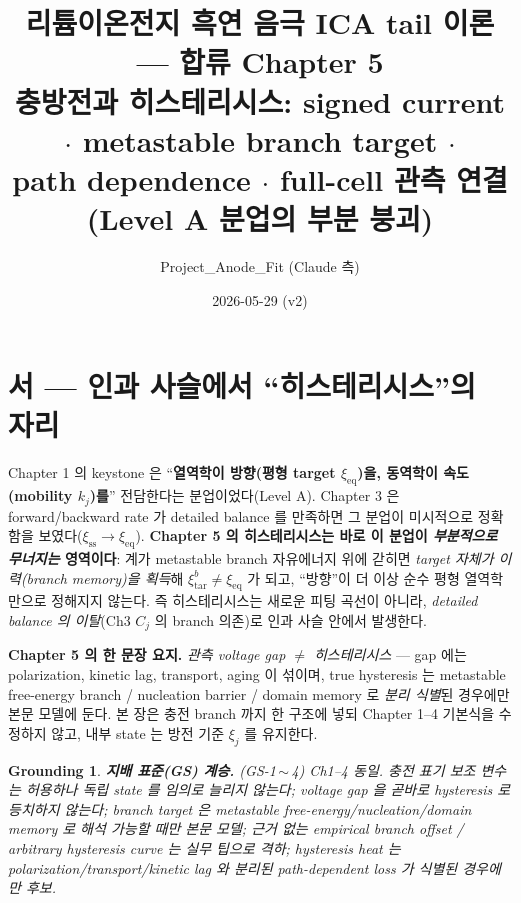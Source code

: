 \documentclass[11pt,a4paper]{article}
\title{\textbf{리튬이온전지 흑연 음극 ICA tail 이론 — 합류 Chapter 5}\\[0.4em]
\large 충방전과 히스테리시스: signed current $\cdot$ metastable branch target $\cdot$\\
path dependence $\cdot$ full-cell 관측 연결 (Level A 분업의 부분 붕괴)}
\author{Project\_Anode\_Fit (Claude 측)}
\date{2026-05-29 (v2)}
\newtheorem*{groundingbox}{Grounding}
\newcommand{\eq}{\mathrm{eq}}
\newcommand{\tar}{\mathrm{tar}}
\newcommand{\sstat}{\mathrm{ss}}
\begin{document}
\maketitle

\section*{서 — 인과 사슬에서 ``히스테리시스''의 자리}
Chapter 1 의 keystone 은 ``\textbf{열역학이 방향(평형 target $\xi_{\eq}$)을, 동역학이 속도(mobility $k_j$)를}''
전담한다는 분업이었다(Level A). Chapter 3 은 forward/backward rate 가 detailed balance 를 만족하면 그 분업이
미시적으로 정확함을 보였다($\xi_{\sstat}\to\xi_{\eq}$). \textbf{Chapter 5 의 히스테리시스는 바로 이 분업이
\emph{부분적으로 무너지는} 영역이다}: 계가 metastable branch 자유에너지 위에 갇히면 \emph{target 자체가
이력(branch memory)을 획득}해 $\xi_{\tar}^b\ne\xi_{\eq}$ 가 되고, ``방향''이 더 이상 순수 평형 열역학만으로
정해지지 않는다. 즉 히스테리시스는 새로운 피팅 곡선이 아니라, \emph{detailed balance 의 이탈}(Ch3 $C_j$ 의
branch 의존)로 인과 사슬 안에서 발생한다.

\textbf{Chapter 5 의 한 문장 요지.} \emph{관측 voltage gap $\ne$ 히스테리시스} — gap 에는 polarization,
kinetic lag, transport, aging 이 섞이며, true hysteresis 는 metastable free-energy branch / nucleation
barrier / domain memory 로 \emph{분리 식별}된 경우에만 본문 모델에 둔다. 본 장은 충전 branch 까지 한 구조에
넣되 Chapter 1--4 기본식을 수정하지 않고, 내부 state 는 방전 기준 $\xi_j$ 를 유지한다.

\begin{groundingbox}
\textbf{지배 표준(GS) 계승.} (GS-1\,$\sim$\,4) Ch1--4 동일. 충전 표기 보조 변수는 허용하나 독립 state 를
임의로 늘리지 않는다; voltage gap 을 곧바로 hysteresis 로 등치하지 않는다; branch target 은 metastable
free-energy/nucleation/domain memory 로 해석 가능할 때만 본문 모델; 근거 없는 empirical branch offset /
arbitrary hysteresis curve 는 실무 팁으로 격하; hysteresis heat 는 polarization/transport/kinetic lag 와
분리된 path-dependent loss 가 식별된 경우에만 후보.
\end{groundingbox}

\tableofcontents
\newpage

\end{document}
